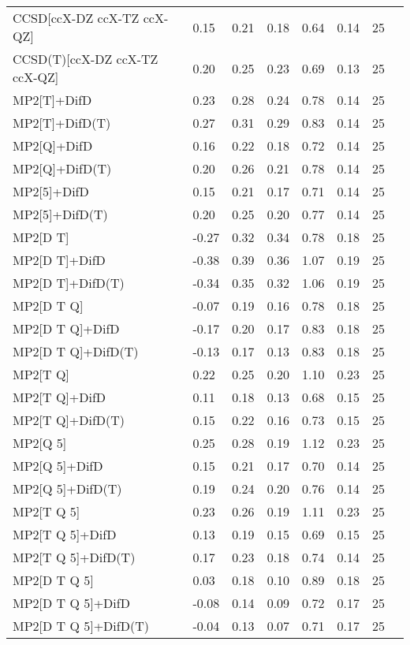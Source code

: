 \begin{table}
\begin{tabular}{l l l l l l l l }
    CCSD[ccX-DZ ccX-TZ ccX-QZ] & 0.15 & 0.21 & 0.18 & 0.64 & 0.14 & 25 \\ 
    CCSD(T)[ccX-DZ ccX-TZ ccX-QZ] & 0.20 & 0.25 & 0.23 & 0.69 & 0.13 & 25 \\ 
    MP2[T]+DifD & 0.23 & 0.28 & 0.24 & 0.78 & 0.14 & 25 \\ 
    MP2[T]+DifD(T) & 0.27 & 0.31 & 0.29 & 0.83 & 0.14 & 25 \\ 
    MP2[Q]+DifD & 0.16 & 0.22 & 0.18 & 0.72 & 0.14 & 25 \\ 
    MP2[Q]+DifD(T) & 0.20 & 0.26 & 0.21 & 0.78 & 0.14 & 25 \\ 
    MP2[5]+DifD & 0.15 & 0.21 & 0.17 & 0.71 & 0.14 & 25 \\ 
    MP2[5]+DifD(T) & 0.20 & 0.25 & 0.20 & 0.77 & 0.14 & 25 \\ 
    MP2[D T] & -0.27 & 0.32 & 0.34 & 0.78 & 0.18 & 25 \\ 
    MP2[D T]+DifD & -0.38 & 0.39 & 0.36 & 1.07 & 0.19 & 25 \\ 
    MP2[D T]+DifD(T) & -0.34 & 0.35 & 0.32 & 1.06 & 0.19 & 25 \\ 
    MP2[D T Q] & -0.07 & 0.19 & 0.16 & 0.78 & 0.18 & 25 \\ 
    MP2[D T Q]+DifD & -0.17 & 0.20 & 0.17 & 0.83 & 0.18 & 25 \\ 
    MP2[D T Q]+DifD(T) & -0.13 & 0.17 & 0.13 & 0.83 & 0.18 & 25 \\ 
    MP2[T Q] & 0.22 & 0.25 & 0.20 & 1.10 & 0.23 & 25 \\ 
    MP2[T Q]+DifD & 0.11 & 0.18 & 0.13 & 0.68 & 0.15 & 25 \\ 
    MP2[T Q]+DifD(T) & 0.15 & 0.22 & 0.16 & 0.73 & 0.15 & 25 \\ 
    MP2[Q 5] & 0.25 & 0.28 & 0.19 & 1.12 & 0.23 & 25 \\ 
    MP2[Q 5]+DifD & 0.15 & 0.21 & 0.17 & 0.70 & 0.14 & 25 \\ 
    MP2[Q 5]+DifD(T) & 0.19 & 0.24 & 0.20 & 0.76 & 0.14 & 25 \\ 
    MP2[T Q 5] & 0.23 & 0.26 & 0.19 & 1.11 & 0.23 & 25 \\ 
    MP2[T Q 5]+DifD & 0.13 & 0.19 & 0.15 & 0.69 & 0.15 & 25 \\ 
    MP2[T Q 5]+DifD(T) & 0.17 & 0.23 & 0.18 & 0.74 & 0.14 & 25 \\ 
    MP2[D T Q 5] & 0.03 & 0.18 & 0.10 & 0.89 & 0.18 & 25 \\ 
    MP2[D T Q 5]+DifD & -0.08 & 0.14 & 0.09 & 0.72 & 0.17 & 25 \\ 
    MP2[D T Q 5]+DifD(T) & -0.04 & 0.13 & 0.07 & 0.71 & 0.17 & 25 \\ 
    \bottomrule
  \end{tabular}
\end{table}
